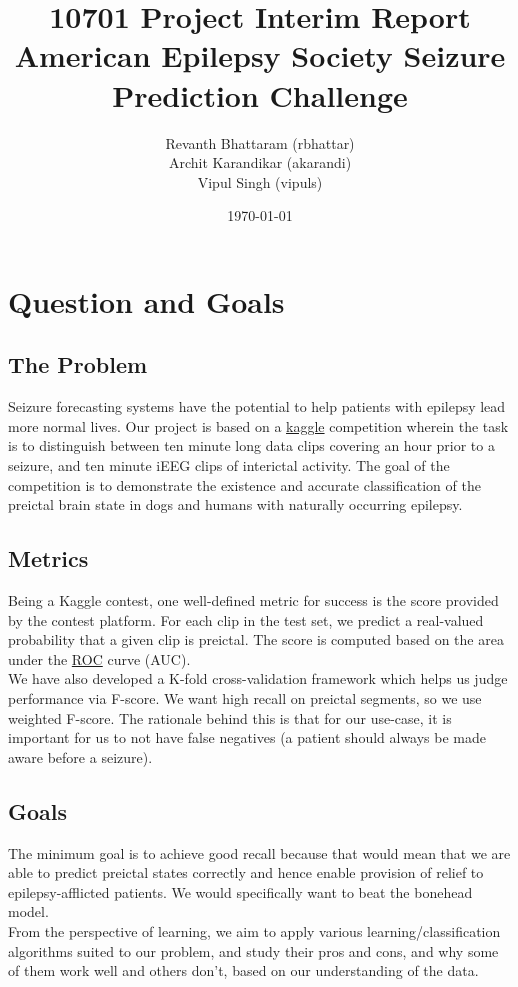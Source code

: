 \documentclass[a4paper]{article}
\title{10701 Project Interim Report \\
\Large{American Epilepsy Society Seizure Prediction Challenge}}
\author{Revanth Bhattaram (rbhattar) \\ 
Archit Karandikar (akarandi) \\ 
Vipul Singh (vipuls)}
\date{\today}
\begin{document}
\maketitle

\section{Question and Goals}

\subsection{The Problem} 
Seizure forecasting systems have the potential to help patients with epilepsy lead more normal lives. Our project is based on a \href{https://www.kaggle.com/c/seizure-prediction}{kaggle} competition wherein the task is to distinguish between ten minute long data clips covering an hour prior to a seizure, and ten minute iEEG clips of interictal activity. The goal of the competition is to demonstrate the existence and accurate classification of the preictal brain state in dogs and humans with naturally occurring epilepsy.

\subsection{Metrics} 
Being a Kaggle contest, one well-defined metric for success is the score provided by the contest platform. For each clip in the test set, we predict a real-valued probability that a given clip is preictal. The score is computed based on the area under the \href{http://en.wikipedia.org/wiki/Receiver_operating_characteristic}{ROC} curve (AUC). \\

We have also developed a K-fold cross-validation framework which helps us judge performance via F-score. We want high recall on preictal segments, so we use weighted F-score. The rationale behind this is that for our use-case, it is important for us to not have false negatives (a patient should always be made aware before a seizure).

\subsection{Goals}
The minimum goal is to achieve good recall because that would mean that we are able to predict preictal states correctly and hence enable provision of relief to epilepsy-afflicted patients. We would specifically want to beat the bonehead model. \\
From the perspective of learning, we aim to apply various learning/classification algorithms suited to our problem, and study their pros and cons, and why some of them work well and others don't, based on our understanding of the data.
\end{document}
